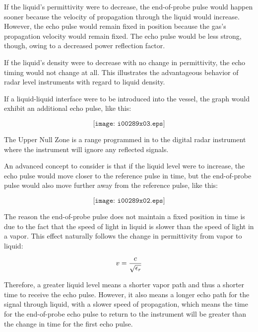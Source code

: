 If the liquid's permittivity were to decrease, the end-of-probe pulse would happen sooner because the velocity of propagation through the liquid would increase.  However, the echo pulse would remain fixed in position because the gas's propagation velocity would remain fixed.  The echo pulse would be less strong, though, owing to a decreased power reflection factor.

\vskip 10pt

If the liquid's density were to decrease with no change in permittivity, the echo timing would not change at all.  This illustrates the advantageous behavior of radar level instruments with regard to liquid density.

\vskip 10pt

If a liquid-liquid interface were to be introduced into the vessel, the graph would exhibit an additional echo pulse, like this:

$$\texttt{[image: i00289x03.eps]}$$

\vskip 10pt

The Upper Null Zone is a range programmed in to the digital radar instrument where the instrument will ignore any reflected signals.

\vskip 30pt

\filbreak

An advanced concept to consider is that if the liquid level were to increase, the echo pulse would move closer to the reference pulse in time, but the end-of-probe pulse would also move further away from the reference pulse, like this:

$$\texttt{[image: i00289x02.eps]}$$

The reason the end-of-probe pulse does not maintain a fixed position in time is due to the fact that the speed of light in liquid is slower than the speed of light in a vapor.  This effect naturally follows the change in permittivity from vapor to liquid:

$$v = {c \over \sqrt{\epsilon_r}}$$

Therefore, a greater liquid level means a shorter vapor path and thus a shorter time to receive the echo pulse.  However, it also means a longer echo path for the signal through liquid, with a slower speed of propagation, which means the time for the end-of-probe echo pulse to return to the instrument will be greater than the change in time for the first echo pulse.




